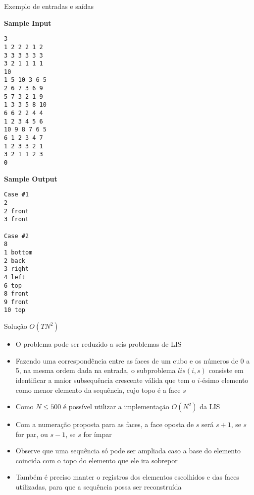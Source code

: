 \begin{frame}[fragile]{Exemplo de entradas e saídas}

\begin{small}
\begin{minipage}[t]{0.55\textwidth}
\textbf{Sample Input}
\begin{verbatim}
3
1 2 2 2 1 2
3 3 3 3 3 3
3 2 1 1 1 1
10
1 5 10 3 6 5
2 6 7 3 6 9
5 7 3 2 1 9
1 3 3 5 8 10
6 6 2 2 4 4
1 2 3 4 5 6
10 9 8 7 6 5
6 1 2 3 4 7
1 2 3 3 2 1
3 2 1 1 2 3
0
\end{verbatim}
\end{minipage}
\begin{minipage}[t]{0.4\textwidth}
\textbf{Sample Output}
\begin{verbatim}
Case #1
2
2 front
3 front

Case #2
8
1 bottom
2 back
3 right
4 left
6 top
8 front
9 front
10 top
\end{verbatim}
\end{minipage}
\end{small}

\end{frame}

\begin{frame}[fragile]{Solução $O(TN^2)$}

   \begin{itemize}
        \item O problema pode ser reduzido a seis problemas de LIS

        \item Fazendo uma correspondência entre as faces de um cubo e os números de 0 a 5,
            na mesma ordem dada na entrada, o subproblema $lis(i, s)$ consiste em identificar
            a maior subsequência crescente válida que tem o $i$-ésimo elemento como menor
            elemento da sequência, cujo topo é a face $s$

        \item Como $N\leq 500$ é possível utilizar a implementação $O(N^2)$ da LIS

        \item Com a numeração proposta para as faces, a face oposta de $s$ será $s + 1$, se
            $s$ for par, ou $s - 1$, se $s$ for ímpar

        \item Observe que uma sequência só pode ser ampliada caso a base do elemento
            coincida com o topo do elemento que ele ira sobrepor

        \item Também é preciso manter o registros dos elementos escolhidos e das faces 
            utilizadas, para que a sequência possa ser reconstruída
   \end{itemize}

\end{frame}

